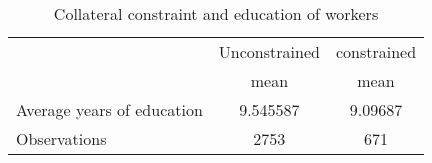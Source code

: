 \begin{table}[htbp]\centering
\def\sym#1{\ifmmode^{#1}\else\(^{#1}\)\fi}
\caption{Collateral constraint and education of workers}
\begin{tabular}{l*{2}{c}}
\toprule
                    &\multicolumn{1}{c}{Unconstrained}&\multicolumn{1}{c}{constrained}\\
                    &        mean&        mean\\
\midrule
Average years of education&    9.545587&     9.09687\\
\midrule
Observations        &        2753&         671\\
\bottomrule
\end{tabular}
\end{table}
